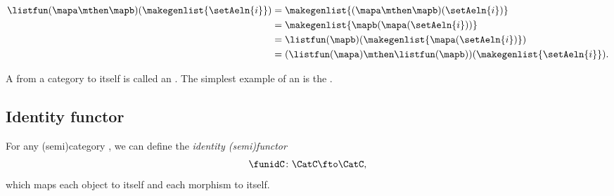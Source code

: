 \begin{example}
\begin{equation}\label{eq:list-functor-compositionality}
    \begin{aligned}
        \listfun(\mapa \mthen \mapb)(\makegenlist{\setAeln{i}}) & =\makegenlist{ (\mapa \mthen \mapb)(\setAeln{i})} \\
                                                                & =\makegenlist{  \mapb ( \mapa (\setAeln{i}))} \\
                                                                & =\listfun(\mapb)(\makegenlist{\mapa(\setAeln{i})}) \\
                                                                & =(\listfun(\mapa)\mthen \listfun(\mapb))(\makegenlist{\setAeln{i}}).
    \end{aligned}
\end{equation}
\end{example}



A  from a category to itself is called an .
The simplest example of an  is the .

\subsection{Identity functor}
\label{sec:identity-functor}

\begin{definition}\label{def:identity-semifunctor}
    For any (semi)category \CatC, we can define the \emph{identity (semi)functor}
    \begin{equation}
        \funidC \colon \CatC \fto \CatC,
    \end{equation}
    which maps each object to itself and each morphism to itself.
\end{definition}

